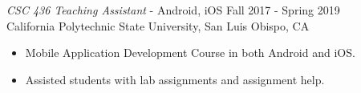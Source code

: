 \documentclass[margin]{res}
\begin{document}
\begin{resume}
                {\sl CSC 436 Teaching Assistant} - Android, iOS \hfill Fall 2017 - Spring 2019 \\
                California Polytechnic State University, San Luis Obispo, CA
                 \begin{itemize}  \itemsep -2pt %
                 \item Mobile Application Development Course in both Android and iOS.
                 \item Assisted students with lab assignments and assignment help.
                \end{itemize}



\end{resume}
\end{document}
